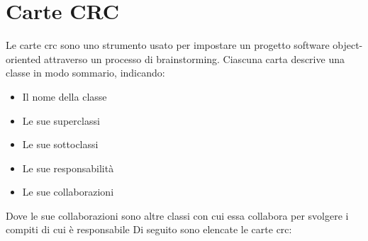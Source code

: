 \section{Carte CRC}
Le carte \gls{crc} sono uno strumento usato per impostare un progetto software object-oriented attraverso un processo di brainstorming.
Ciascuna carta descrive una classe in modo sommario, indicando:
\begin{itemize}
	\item Il nome della classe
 	\item Le sue superclassi
 	\item Le sue sottoclassi
 	\item Le sue responsabilità
 	\item Le sue collaborazioni
\end{itemize}
Dove le sue collaborazioni sono altre classi con cui essa collabora per svolgere i compiti di cui è responsabile
Di seguito sono elencate le carte \gls{crc}:
